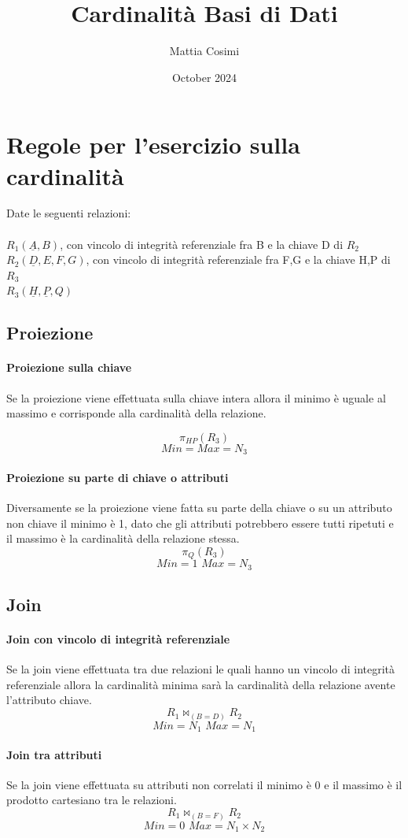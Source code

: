 \documentclass{article}
\title{Cardinalità Basi di Dati}
\author{Mattia Cosimi}
\date{October 2024}
\newcommand{\join}{\mathbin{\bowtie}} %
\begin{document}
\maketitle

\section{Regole per l'esercizio sulla cardinalità}
Date le seguenti relazioni:\\\\
\noindent
$R_1(\underline{A},B)$, con vincolo di integrità referenziale fra B e la chiave D di $R_2$\\
$R_2(\underline{D},E,F,G)$, con vincolo di integrità referenziale fra F,G e la chiave H,P di $R_3$\\
$R_3(\underline{H},\underline{P},Q)$

\subsection{Proiezione}
\paragraph{Proiezione sulla chiave}
Se la proiezione viene effettuata sulla chiave intera allora il minimo è uguale al massimo e corrisponde alla cardinalità della relazione.

$$\pi_{HP}(R_3)$$
$$Min=Max=N_3$$
\paragraph{Proiezione su parte di chiave o attributi}
Diversamente se la proiezione viene fatta su parte della chiave o su un attributo non chiave il minimo è 1, dato che gli attributi potrebbero essere tutti ripetuti e il massimo è la cardinalità della relazione stessa.
$$\pi_{Q}(R_3)$$
$$Min=1\,\,Max=N_3$$
\subsection{Join}
\paragraph{Join con vincolo di integrità referenziale}
Se la join viene effettuata tra due relazioni le quali hanno un vincolo di integrità referenziale allora la cardinalità minima sarà la cardinalità della relazione avente l'attributo chiave.
\[
R_1\join_{(B = D)} R_2
\]
$$Min=N_1\,\,Max=N_1$$
\paragraph{Join tra attributi}
Se la join viene effettuata su attributi non correlati il minimo è 0 e il massimo è il prodotto cartesiano tra le relazioni.
\[
R_1\join_{(B = F)} R_2
\]
$$Min=0\,\,Max=N_1 \times N_2$$
\end{document}
